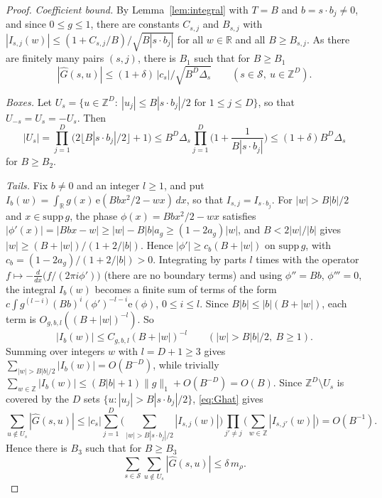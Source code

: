 \documentclass[11pt,reqno]{amsart}
\theoremstyle{definition}
\newcommand{\Z}{\mathbb{Z}}
\newcommand{\R}{\mathbb{R}}
\newcommand{\e}{\mathrm{e}}
\newcommand{\cS}{\mathcal{S}}
\begin{document}
\begin{proof}
\emph{Coefficient bound.} By Lemma~\ref{lem:integral} with $T=B$ and $b=s\cdot b_j\ne0$, and since $0\le g\le1$, there are constants $C_{s,j}$ and $B_{s,j}$ with $|I_{s,j}(w)|\le(1+C_{s,j}/B)/\sqrt{B|s\cdot b_j|}$ for all $w\in\R$ and all $B\ge B_{s,j}$. As there are finitely many pairs $(s,j)$, there is $B_1$ such that for $B\ge B_1$
\begin{equation}\label{eq:coef}
|\widehat G(s,u)|\le(1+\delta)\,|c_s|/\sqrt{B^D\Delta_s}\qquad(s\in\cS,\ u\in\Z^D).
\end{equation}

\emph{Boxes.} Let $U_s=\{u\in\Z^D:\ |u_j|\le B|s\cdot b_j|/2\text{ for }1\le j\le D\}$, so that $U_{-s}=U_s=-U_s$. Then
\[
|U_s|=\prod_{j=1}^D\big(2\lfloor B|s\cdot b_j|/2\rfloor+1\big)\le B^D\Delta_s\prod_{j=1}^D\Big(1+\frac1{B|s\cdot b_j|}\Big)\le(1+\delta)B^D\Delta_s
\]
for $B\ge B_2$.

\emph{Tails.} Fix $b\ne0$ and an integer $l\ge1$, and put $I_b(w)=\int_\R g(x)\,\e(Bbx^2/2-wx)\,dx$, so that $I_{s,j}=I_{s\cdot b_j}$. For $|w|>B|b|/2$ and $x\in\mathrm{supp}\,g$, the phase $\phi(x)=Bbx^2/2-wx$ satisfies $|\phi'(x)|=|Bbx-w|\ge|w|-B|b|a_g\ge(1-2a_g)|w|$, and $B<2|w|/|b|$ gives $|w|\ge(B+|w|)/(1+2/|b|)$. Hence $|\phi'|\ge c_b(B+|w|)$ on $\mathrm{supp}\,g$, with $c_b=(1-2a_g)/(1+2/|b|)>0$. Integrating by parts $l$ times with the operator $f\mapsto-\frac d{dx}\big(f/(2\pi i\phi')\big)$ (there are no boundary terms) and using $\phi''=Bb$, $\phi'''=0$, the integral $I_b(w)$ becomes a finite sum of terms of the form $c\int g^{(l-i)}(Bb)^i(\phi')^{-l-i}\e(\phi)$, $0\le i\le l$. Since $B|b|\le|b|(B+|w|)$, each term is $O_{g,b,l}((B+|w|)^{-l})$. So
\[
|I_b(w)|\le C_{g,b,l}(B+|w|)^{-l}\qquad(|w|>B|b|/2,\ B\ge1).
\]
Summing over integers $w$ with $l=D+1\ge3$ gives $\sum_{|w|>B|b|/2}|I_b(w)|=O(B^{-D})$, while trivially $\sum_{w\in\Z}|I_b(w)|\le(B|b|+1)\|g\|_1+O(B^{-D})=O(B)$. Since $\Z^D\setminus U_s$ is covered by the $D$ sets $\{u:|u_j|>B|s\cdot b_j|/2\}$, \eqref{eq:Ghat} gives
\[
\sum_{u\notin U_s}|\widehat G(s,u)|\le|c_s|\sum_{j=1}^D\Big(\sum_{|w|>B|s\cdot b_j|/2}|I_{s,j}(w)|\Big)\prod_{j'\ne j}\Big(\sum_{w\in\Z}|I_{s,j'}(w)|\Big)=O(B^{-1}).
\]
Hence there is $B_3$ such that for $B\ge B_3$
\begin{equation}\label{eq:tail}
\sum_{s\in\cS}\sum_{u\notin U_s}|\widehat G(s,u)|\le\delta\,m_\rho .
\end{equation}


\end{proof}
\end{document}
